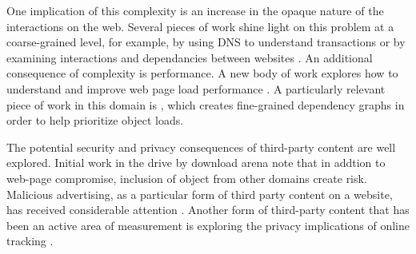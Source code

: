 One implication of this complexity is an increase in the opaque nature
of the interactions on the web. Several pieces of work shine light on
this problem at a coarse-grained level, for example, by using DNS to
understand transactions \cite{Bermudez:2012:DRD:2398776.2398819} or by
examining interactions and dependancies between websites
\cite{Pujol:2014:BWT:2663716.2663756}. An additional consequence of
complexity is performance. A new body of work explores how to
understand and improve web page load performance \cite{180330}. A
particularly relevant piece of work in this domain is \cite{194916},
which creates fine-grained dependency graphs in order to help
prioritize object loads.

The potential security and privacy consequences of third-party content
are well explored. Initial work in the drive by download arena
\cite{Provos:2008:YIP:1496711.1496712,Cova:2010:DAD:1772690.1772720,Provos:2007:GBA:1323128.1323132}
note that in addtion to web-page compromise, inclusion of object from
other domains create risk. Malicious advertising, as a particular form
of third party content on a website, has received considerable
attention
\cite{Zarras:2014:DAM:2663716.2663719,Li:2012:KYE:2382196.2382267}. Another
form of third-party content that has been an active area of
measurement is exploring the privacy implications of online tracking
\cite{mayer2012third,roesner2012detecting}.


